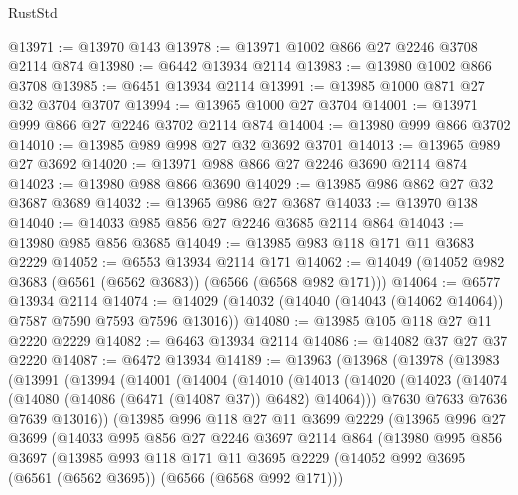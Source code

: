 \begin{lexlean}{RustStd}
\begin{coremodule}
@13971 := @13970 @143
@13978 := @13971 @1002 @866 @27 @2246 @3708 @2114 @874
@13980 := @6442 @13934 @2114
@13983 := @13980 @1002 @866 @3708
@13985 := @6451 @13934 @2114
@13991 := @13985 @1000 @871 @27 @32 @3704 @3707
@13994 := @13965 @1000 @27 @3704
@14001 := @13971 @999 @866 @27 @2246 @3702 @2114 @874
@14004 := @13980 @999 @866 @3702
@14010 := @13985 @989 @998 @27 @32 @3692 @3701
@14013 := @13965 @989 @27 @3692
@14020 := @13971 @988 @866 @27 @2246 @3690 @2114 @874
@14023 := @13980 @988 @866 @3690
@14029 := @13985 @986 @862 @27 @32 @3687 @3689
@14032 := @13965 @986 @27 @3687
@14033 := @13970 @138
@14040 := @14033 @985 @856 @27 @2246 @3685 @2114 @864
@14043 := @13980 @985 @856 @3685
@14049 := @13985 @983 @118 @171 @11 @3683 @2229
@14052 := @6553 @13934 @2114 @171
@14062 := @14049 (@14052 @982 @3683 (@6561 (@6562 @3683)) (@6566 (@6568 @982 @171)))
@14064 := @6577 @13934 @2114
@14074 := @14029 (@14032 (@14040 (@14043 (@14062 @14064)) @7587 @7590 @7593 @7596 @13016))
@14080 := @13985 @105 @118 @27 @11 @2220 @2229
@14082 := @6463 @13934 @2114
@14086 := @14082 @37 @27 @37 @2220
@14087 := @6472 @13934
@14189 := @13963
    (@13968
      (@13978
        (@13983
          (@13991
            (@13994
              (@14001
                (@14004
                  (@14010
                    (@14013
                      (@14020
                        (@14023 (@14074 (@14080 (@14086 (@6471 (@14087 @37)) @6482) @14064)))
                        @7630
                        @7633
                        @7636
                        @7639
                        @13016))
                    (@13985
                      @996
                      @118
                      @27
                      @11
                      @3699
                      @2229
                      (@13965
                        @996
                        @27
                        @3699
                        (@14033
                          @995
                          @856
                          @27
                          @2246
                          @3697
                          @2114
                          @864
                          (@13980
                            @995
                            @856
                            @3697
                            (@13985
                              @993
                              @118
                              @171
                              @11
                              @3695
                              @2229
                              (@14052 @992 @3695 (@6561 (@6562 @3695)) (@6566 (@6568 @992 @171)))

\end{coremodule}
\end{lexlean}
